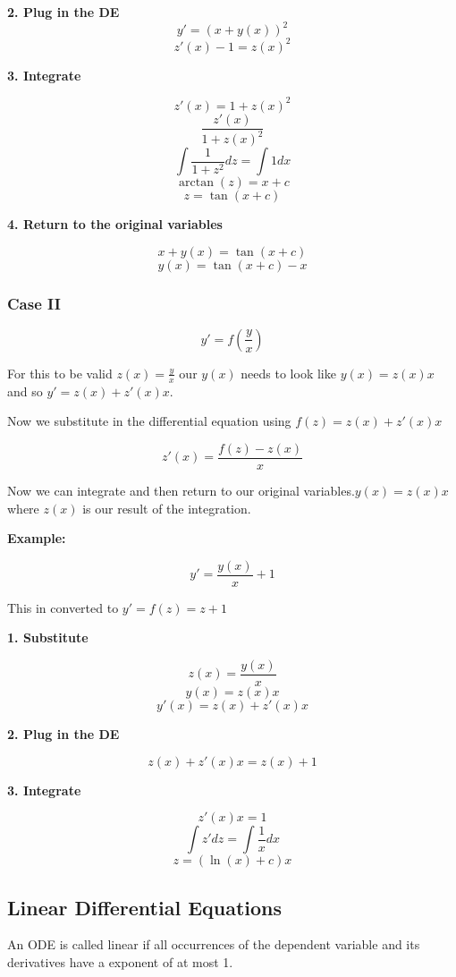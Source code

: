 \textbf{2. Plug in the DE}
\[y' = {(x + y(x))}^2\]
\[z'(x) - 1 = {z(x)}^2\]

\textbf{3. Integrate}

\[z'(x) = 1 + {z(x)}^2\]
\[\frac{z'(x)}{1 + {z(x)}^2}\]
\[\int \frac{1}{1 + z^2} dz = \int 1 dx\]
\[\arctan (z) = x + c\]
\[z = \tan(x + c)\]

\textbf{4. Return to the original variables}

\[x + y(x) = \tan(x + c)\]
\[y(x) = \tan(x + c) - x\]

\subsubsection{Case II}

\[y' = f(\frac{y}{x})\]

For this to be valid \(z(x) = \frac{y}{x}\) our \(y(x)\) needs to look like \(y(x) = z(x)x\) and so \(y' = z(x) + z'(x)x\).
\vspace{\baselineskip}

Now we substitute in the differential equation using \(f(z) = z(x) + z'(x)x\)

\[
z'(x) = \frac{f(z) - z(x)}{x}
\]

Now we can integrate and then return to our original variables.\(y(x) = z(x)x \) where \(z(x)\) is our
result of the integration.
\vspace{\baselineskip}

\textbf{Example:}
\vspace{\baselineskip}

\[y' = \frac{y(x)}{x} + 1\]

This in converted to \(y' = f(z) = z + 1\)
\vspace{\baselineskip}

\textbf{1. Substitute}

\[z(x) = \frac{y(x)}{x}\]
\[y(x) = z(x)x\]
\[y'(x) = z(x) + z'(x)x\]

\textbf{2. Plug in the DE}

\[z(x) + z'(x)x = z(x) + 1\]

\textbf{3. Integrate}

\[z'(x)x = 1\]
\[\int z' dz = \int \frac{1}{x} dx\]
\[z = (\ln(x) + c)x\]

\subsection{Linear Differential Equations}

An ODE is called linear if all occurrences of the dependent variable and its
derivatives have a exponent of at most 1.

